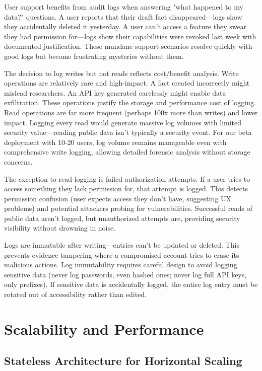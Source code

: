 \documentclass[12pt,a4paper]{article}
\begin{document}
User support benefits from audit logs when answering "what happened to my data?" questions. A user reports that their draft fact disappeared—logs show they accidentally deleted it yesterday. A user can't access a feature they swear they had permission for—logs show their capabilities were revoked last week with documented justification. These mundane support scenarios resolve quickly with good logs but become frustrating mysteries without them.

The decision to log writes but not reads reflects cost/benefit analysis. Write operations are relatively rare and high-impact. A fact created incorrectly might mislead researchers. An API key generated carelessly might enable data exfiltration. These operations justify the storage and performance cost of logging. Read operations are far more frequent (perhaps 100x more than writes) and lower impact. Logging every read would generate massive log volumes with limited security value—reading public data isn't typically a security event. For our beta deployment with 10-20 users, log volume remains manageable even with comprehensive write logging, allowing detailed forensic analysis without storage concerns.

The exception to read-logging is failed authorization attempts. If a user tries to access something they lack permission for, that attempt is logged. This detects permission confusion (user expects access they don't have, suggesting UX problems) and potential attackers probing for vulnerabilities. Successful reads of public data aren't logged, but unauthorized attempts are, providing security visibility without drowning in noise.

Logs are immutable after writing—entries can't be updated or deleted. This prevents evidence tampering where a compromised account tries to erase its malicious actions. Log immutability requires careful design to avoid logging sensitive data (never log passwords, even hashed ones; never log full API keys, only prefixes). If sensitive data is accidentally logged, the entire log entry must be rotated out of accessibility rather than edited.

\section{Scalability and Performance}

\subsection{Stateless Architecture for Horizontal Scaling}
\end{document}
